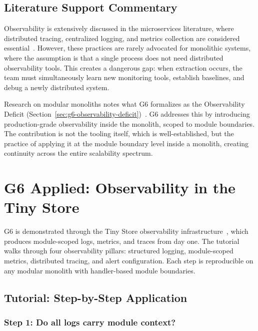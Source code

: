 \subsection*{Literature Support Commentary}

Observability is extensively discussed in the microservices literature, where distributed tracing, centralized logging, and metrics collection are considered essential~\cite{arya2024beyond}. However, these practices are rarely advocated for monolithic systems, where the assumption is that a single process does not need distributed observability tools. This creates a dangerous gap: when extraction occurs, the team must simultaneously learn new monitoring tools, establish baselines, and debug a newly distributed system.

Research on modular monoliths notes what G6 formalizes as the Observability Deficit (Section~\ref{sec:g6-observability-deficit})~\cite{montesi2021sliceable, gravanis2021dont}. G6 addresses this by introducing production-grade observability inside the monolith, scoped to module boundaries. The contribution is not the tooling itself, which is well-established, but the practice of applying it at the module boundary level inside a monolith, creating continuity across the entire scalability spectrum.


\section*{G6 Applied: Observability in the Tiny Store}
\label{sec:g6-applied}

G6 is demonstrated through the Tiny Store observability infrastructure~\cite{tinystore2026}, which produces module-scoped logs, metrics, and traces from day one. The tutorial walks through four observability pillars: structured logging, module-scoped metrics, distributed tracing, and alert configuration. Each step is reproducible on any modular monolith with handler-based module boundaries.

\subsection*{Tutorial: Step-by-Step Application}

\subsubsection*{Step 1: Do all logs carry module context?}

